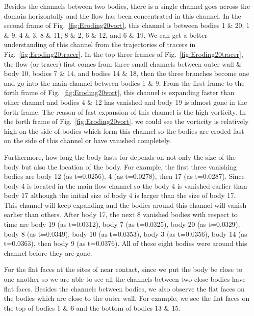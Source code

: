 \documentclass[preprint, 10pt]{elsarticle}
\begin{document}
{\color{red} 
Besides the channels between two bodies, there is a single channel goes
across the domain horizontally and the flow has been concentrated in
this channel.  In the second frame of Fig.~\ref{fig:Eroding20vort}, this
channel is between bodies 1 \& 20, 1 \& 9, 4 \& 3, 8 \& 11, 8 \& 2, 6 \&
12, and 6 \& 19.  We can get a better understanding of this channel from
the trajectories of tracers in Fig.~\ref{fig:Eroding20tracer}.  In the
top three frames of  Fig.~\ref{fig:Eroding20tracer}, the flow (or
tracer) first comes from three small channels between outer wall \& body
10, bodies 7 \& 14, and bodies 14 \& 18, then the three branches become
one and go into the main channel between bodies 1 \& 9.  From the first
frame to the forth frame of Fig.~\ref{fig:Eroding20vort}, this channel
is expanding faster than other channel and bodies 4 \& 12 has vanished
and body 19 is almost gone in the forth frame.  The reason of fast
expansion of this channel is the high vorticity.  In the forth frame of
Fig.~\ref{fig:Eroding20vort}, we could see the vorticity is relatively
high on the side of bodies which form this channel so the bodies are
eroded fast on the side of this channel or have vanished completely.

Furthermore, how long the body lasts for depends on not only the size of
the body but also the location of the body.  For example, the first
three vanishing bodies are body 12 (as t=0.0256), 4 (as t=0.0278), then
17 (as t=0.0287).  Since body 4 is located in the main flow channel so
the body 4 is vanished earlier than body 17 although the initial size of
body 4 is larger than the size of body 17.  This channel will keep
expanding and the bodies around this channel will vanish earlier than
others.  After body 17, the next 8 vanished bodies with respect to time
are body 19 (as t=0.0312),  body 7 (as t=0.0325), body 20 (as t=0.0329),
body 8 (as t=0.0349), body 10 (as t=0.0353), body 3 (as t=0.0356), body
14 (as t=0.0363), then body 9 (as t=0.0376).  All of these eight bodies
were around this channel before they are gone.

For the flat faces at the sites of near contact, since we put the body
be close to one another so we are able to see all the channels between
two close bodies have flat faces.  Besides the channels between bodies,
we also observe the flat faces on the bodies which are close to the
outer wall. For example, we see the flat faces on the top of bodies 1 \&
6 and the bottom of bodies 13 \& 15.  

}
\end{document}
